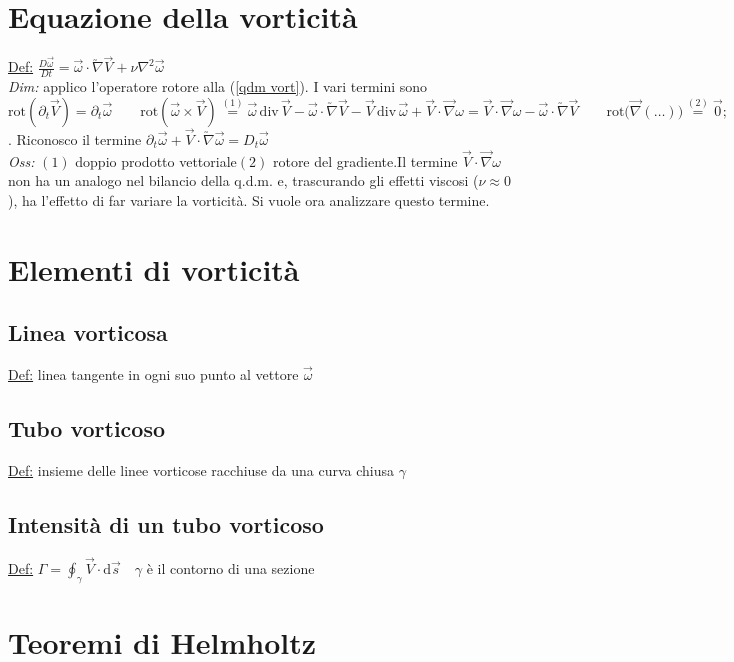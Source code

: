 \documentclass[11pt,a4paper]{report}
\newcommand{\de}{\mathrm d}
\begin{document}
	\section{Equazione della vorticità}	\label{eq vorticita}
	\underline{Def:} $\frac{D\vec\omega}{Dt}=\vec\omega\cdot\utilde\nabla\vec V+\nu\nabla^2\vec\omega$\\
	\textit{Dim:} applico l'operatore rotore alla (\ref{qdm vort}). I vari termini sono $\mathrm{rot}(\partial_t\vec V)=\partial_t\vec\omega\qquad\mathrm{rot}(\vec\omega\times\vec V)\overset{(1)}{=}\vec\omega\,\mathrm{div}\,\vec V-\vec\omega\cdot\utilde\nabla\vec V-\vec V\,\mathrm{div}\,\vec\omega+\vec V\cdot\vec\nabla\omega=\vec V\cdot\vec\nabla\omega-\vec\omega\cdot\utilde\nabla\vec V\qquad\mathrm{rot}\big(\vec\nabla(\ldots)\big)\overset{(2)}{=}\vec0;\quad\mathrm{rot}(-\nu\,\mathrm{rot}\,\vec\omega)\overset{(3)}{=}\nu\,\mathrm{rot}(-\mathrm{rot}\,\vec\omega)=\nu\,\mathrm{rot}(\nabla^2\vec V)=\nu\nabla^2\vec\omega$. Riconosco il termine $\partial_t\vec\omega+\vec V\cdot\utilde\nabla\vec\omega=D_t\vec\omega$\\
	\textit{Oss:} $(1)$ doppio prodotto vettoriale\quad$(2)$ rotore del gradiente.\quad Il termine $\vec V\cdot\vec\nabla\omega$ non ha un analogo nel bilancio della q.d.m. e, trascurando gli effetti viscosi ($\nu\approx 0$), ha l'effetto di far variare la vorticità. Si vuole ora analizzare questo termine.
	
	\section{Elementi di vorticità}
		\subsection{Linea vorticosa}
		\underline{Def:} linea tangente in ogni suo punto al vettore $\vec\omega$
		\subsection{Tubo vorticoso}
		\underline{Def:} insieme delle linee vorticose racchiuse da una curva chiusa $\gamma$
		\subsection{Intensità di un tubo vorticoso}	\label{intens tubo vort}
		\underline{Def:} $\Gamma=\oint_\gamma\vec V\cdot\de \vec s\quad\gamma$ è il contorno di una sezione
	\section{Teoremi di Helmholtz}
\end{document}
